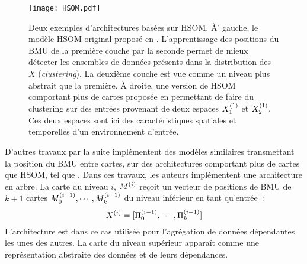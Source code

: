 \documentclass[../main]{subfiles}
\begin{document}
\begin{figure}[t]
    \centering
    \texttt{[image: HSOM.pdf]}
    \caption{Deux exemples d'architectures basées sur HSOM. \`A' gauche, le modèle HSOM original proposé en \cite{lampinen_clustering_1992}. L'apprentissage des positions du BMU de la première couche par la seconde permet de mieux détecter les ensembles de données présents dans la distribution des $X$ (\emph{clustering}).
    La deuxième couche est vue comme un niveau plus abstrait que la première. 
    \`A droite, une version de HSOM comportant plus de cartes proposée en \cite{hagenauer_hierarchical_2013} permettant de faire du clustering sur des entrées provenant de deux espaces $X_1^{({1})}$ et $X_2^{({1})}$. Ces deux espaces sont ici des caractéristiques spatiales et temporelles d'un environnement d'entrée.
    \label{fig:hsom}}
\end{figure}


D'autres travaux par la suite implémentent des modèles similaires transmettant la position du BMU entre cartes, sur des architectures comportant plus de cartes que HSOM, tel que \cite{Paplinski2005MultimodalFS,hagenauer_hierarchical_2013}.
Dans ces travaux, les auteurs implémentent une architecture en arbre. La carte du niveau $i$, $M^{({i})}$ reçoit un vecteur de positions de BMU de $k+1$ cartes $M_0^{({i-1})}, \cdots, M_k^{({i-1})}$  du niveau inférieur en tant qu'entrée~:
$$ X^{({i})} = [\Pi_0^{({i-1})}, \cdots, \Pi_k^{({i-1})}]$$
L'architecture est dans ce cas utilisée pour l'agrégation de données dépendantes les unes des autres.
La carte du niveau supérieur apparaît comme une représentation abstraite des données et de leurs dépendances.
\end{document}
